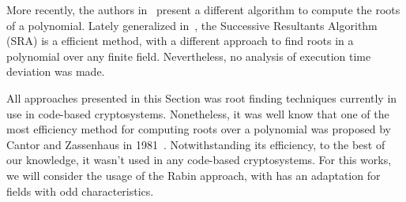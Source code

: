 More recently, the authors in~\cite{petit2014finding} present a different algorithm to compute the roots of a polynomial. Lately generalized in~\cite{petit2016finding}, the Successive Resultants Algorithm (SRA) is a efficient method, with a different approach to find roots in a polynomial over any finite field. Nevertheless, no analysis of execution time deviation was made.

All approaches presented in this Section was root finding techniques currently in use in code-based cryptosystems. Nonetheless, it was well know that one of the most efficiency method for computing roots over a polynomial was proposed by Cantor and Zassenhaus in 1981~\cite{cantor1981new}. Notwithstanding its efficiency, to the best of our knowledge, it wasn't used in any code-based cryptosystems. For this works, we will consider the usage of the Rabin approach, with has an adaptation for fields with odd characteristics.